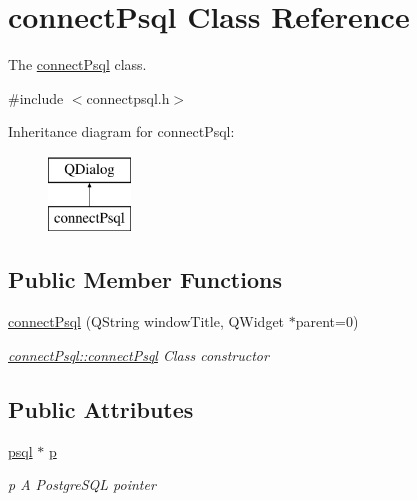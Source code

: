 \hypertarget{classconnect_psql}{}\section{connect\+Psql Class Reference}
\label{classconnect_psql}


The \mbox{\hyperlink{classconnect_psql}{connect\+Psql}} class.  




{\ttfamily \#include $<$connectpsql.\+h$>$}

Inheritance diagram for connect\+Psql\+:\begin{figure}[H]
\begin{center}
\leavevmode
\includegraphics[height=2.000000cm]{classconnect_psql}
\end{center}
\end{figure}
\subsection*{Public Member Functions}
\begin{DoxyCompactItemize}
\item 
\mbox{\hyperlink{classconnect_psql_aee2b55cd64f5b2fac084eda4e6db0075}{connect\+Psql}} (Q\+String window\+Title, Q\+Widget $\ast$parent=0)
\begin{DoxyCompactList}\small\item\em \mbox{\hyperlink{classconnect_psql_aee2b55cd64f5b2fac084eda4e6db0075}{connect\+Psql\+::connect\+Psql}} Class constructor \end{DoxyCompactList}\end{DoxyCompactItemize}
\subsection*{Public Attributes}
\begin{DoxyCompactItemize}
\item 
\mbox{\label{classconnect_psql_a5855dbe20b8e699563c0958462236bf2}} 
\mbox{\hyperlink{classpsql}{psql}} $\ast$ \mbox{\hyperlink{classconnect_psql_a5855dbe20b8e699563c0958462236bf2}{p}}
\begin{DoxyCompactList}\small\item\em p A Postgre\+S\+QL pointer \end{DoxyCompactList}\end{DoxyCompactItemize}


